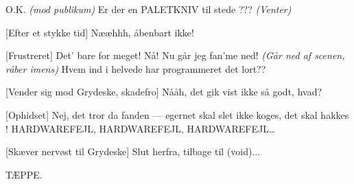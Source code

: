 \documentclass{article}
\begin{document}
\begin{sketch}
 O.K. {\em (mod publikum)} Er der en PALETKNIV til stede ???
{\em(Venter)}

[Efter et stykke tid] Nææhhh, åbenbart ikke!

[Frustreret] Det' bare for meget! Nå! Nu går jeg
fan'me ned!  {\em(Går ned af scenen, råber imens)} Hvem ind i helvede
har programmeret det lort??

[Vender sig mod Grydeske, skadefro] Nååh, det gik
vist ikke så godt, hvad?

[Ophidset] Nej, det tror da fanden --- egernet skal
slet ikke koges, det skal hakkes ! HARDWAREFEJL, HARDWAREFEJL,
HARDWAREFEJL\ldots

[Skæver nervøst til Grydeske] Slut herfra, tilbage
til (void)...


\scene TÆPPE.


\end{sketch}
\end{document}
